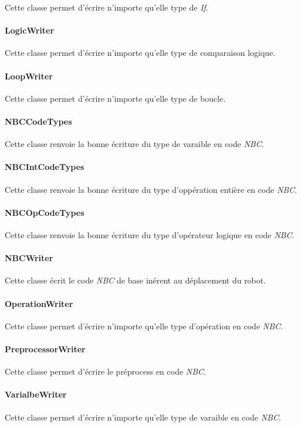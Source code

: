 Cette classe permet d'écrire n'importe qu'elle type de \emph{If}.

\paragraph{LogicWriter}

Cette classe permet d'écrire n'importe qu'elle type de comparaison logique.

\paragraph{LoopWriter}

Cette classe permet d'écrire n'importe qu'elle type de boucle.

\paragraph{NBCCodeTypes}

Cette classe renvoie la bonne écriture du type de varaible en code \emph{NBC}.

\paragraph{NBCIntCodeTypes}

Cette classe renvoie la bonne écriture du type d'oppération entière en code \emph{NBC}.

\paragraph{NBCOpCodeTypes}

Cette classe renvoie la bonne écriture du type d'opérateur logique en code \emph{NBC}.

\paragraph{NBCWriter}

Cette classe écrit le code \emph{NBC} de base inérent au déplacement du robot.

\paragraph{OperationWriter}

Cette classe permet d'écrire n'importe qu'elle type d'opération en code \emph{NBC}.

\paragraph{PreprocessorWriter}

Cette classe permet d'écrire le préprocess en code \emph{NBC}.

\paragraph{VarialbeWriter}

Cette classe permet d'écrire n'importe qu'elle type de varaible en code \emph{NBC}.
